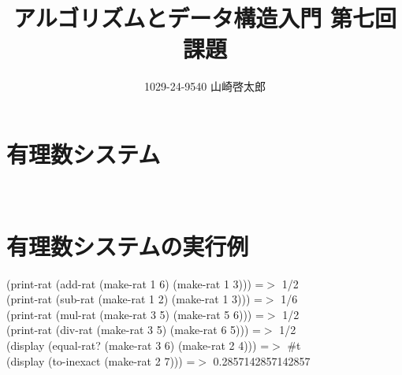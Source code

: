 ﻿\documentclass[a4paper,12pt]{article}
\title{アルゴリズムとデータ構造入門 第七回課題}
\author{1029-24-9540 山崎啓太郎}
\begin{document}
\maketitle

\section{有理数システム}
\lstset{numbers=left,basicstyle=\small}

\\
\section{有理数システムの実行例}
(print-rat (add-rat (make-rat 1 6) (make-rat 1 3))) =$>$ 1/2\\
(print-rat (sub-rat (make-rat 1 2) (make-rat 1 3))) =$>$ 1/6\\
(print-rat (mul-rat (make-rat 3 5) (make-rat 5 6))) =$>$ 1/2\\
(print-rat (div-rat (make-rat 3 5) (make-rat 6 5))) =$>$ 1/2\\
(display (equal-rat? (make-rat 3 6) (make-rat 2 4))) =$>$ #t\\
(display (to-inexact (make-rat 2 7))) =$>$ 0.2857142857142857\\
\\
\end{document}
